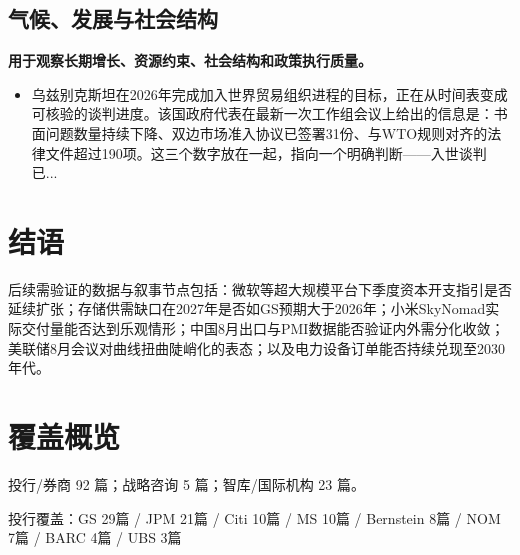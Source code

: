 \documentclass[11pt]{ctexart}
\begin{document}
\subsection{气候、发展与社会结构}
\textbf{用于观察长期增长、资源约束、社会结构和政策执行质量。}
\begin{itemize}
  \item 乌兹别克斯坦在2026年完成加入世界贸易组织进程的目标，正在从时间表变成可核验的谈判进度。该国政府代表在最新一次工作组会议上给出的信息是：书面问题数量持续下降、双边市场准入协议已签署31份、与WTO规则对齐的法律文件超过190项。这三个数字放在一起，指向一个明确判断——入世谈判已...
\end{itemize}
\section{结语}
后续需验证的数据与叙事节点包括：微软等超大规模平台下季度资本开支指引是否延续扩张；存储供需缺口在2027年是否如GS预期大于2026年；小米SkyNomad实际交付量能否达到乐观情形；中国8月出口与PMI数据能否验证内外需分化收敛；美联储8月会议对曲线扭曲陡峭化的表态；以及电力设备订单能否持续兑现至2030年代。
\newpage
\section{覆盖概览}
投行/券商 92 篇；战略咨询 5 篇；智库/国际机构 23 篇。\par
投行覆盖：GS 29篇 / JPM 21篇 / Citi 10篇 / MS 10篇 / Bernstein 8篇 / NOM 7篇 / BARC 4篇 / UBS 3篇\par
\end{document}
